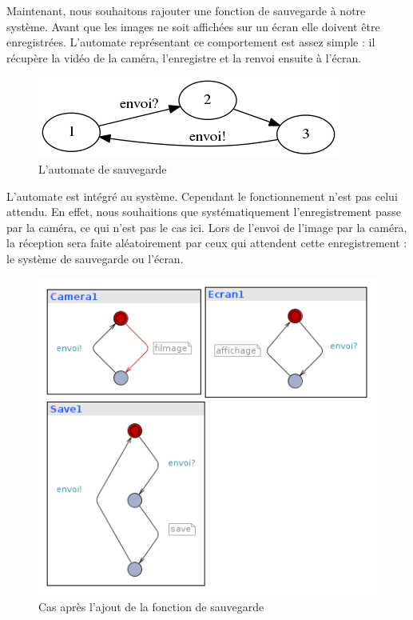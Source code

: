 \documentclass[12pt,a4paper]{report}
\begin{document}
    Maintenant, nous souhaitons rajouter une fonction de sauvegarde à notre système. Avant que les images ne soit affichées sur un écran elle doivent être enregistrées. L'automate représentant ce comportement est assez simple : il récupère la vidéo de la caméra, l'enregistre et la renvoi ensuite à l'écran.

\begin{figure}[H]
  \centering
  \includegraphics[scale=0.6]{ressources/save.png}
  \caption{L'automate de sauvegarde}
\end{figure} 

\newpage
    L'automate est intégré au système. Cependant le fonctionnement n'est pas celui attendu. En effet, nous souhaitions que systématiquement l'enregistrement passe par la caméra, ce qui n'est pas le cas ici. Lors de l'envoi de l'image par la caméra, la réception sera faite aléatoirement par ceux qui attendent cette enregistrement : le système de sauvegarde ou l'écran.
    
\begin{figure}[H]
  \centering
  \includegraphics[scale=0.6]{ressources/cameraSave.png}
  \caption{Cas après l'ajout de la fonction de sauvegarde}
\end{figure}     
    
\end{document}
